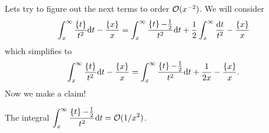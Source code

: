\M
Lets try to figure out the next terms to order $\mathcal{O}(x^{-2})$. We will
consider
\begin{equation}
\int^{\infty}_{x}\frac{\fracPart{t}}{t^{2}}\D t-\frac{\fracPart{x}}{x}
=\int^{\infty}_{x}\frac{\fracPart{t}-\frac{1}{2}}{t^{2}}\D
t+\frac{1}{2}\int^{\infty}_{x}\frac{\D t}{t^{2}}-\frac{\fracPart{x}}{x}
\end{equation}
which simplifies to
\begin{equation}
\int^{\infty}_{x}\frac{\fracPart{t}}{t^{2}}\D t-\frac{\fracPart{x}}{x}
=\int^{\infty}_{x}\frac{\fracPart{t}-\frac{1}{2}}{t^{2}}\D t
+\frac{1}{2x}-\frac{\fracPart{x}}{x}.
\end{equation}
Now we make a claim!

 The integral $\displaystyle{\int^{\infty}_{x}\frac{\mathop{\{}\nolimits\!t\!\mathop{\}}\nolimits-\frac{1}{2}}{t^{2}}\mathrm{d}t=\mathcal{O}(1/x^{2})}$.


